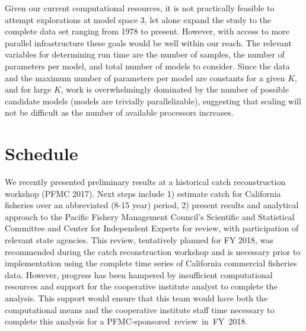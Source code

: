 \documentclass[12pt]{article}
\begin{document}
Given our current computational resources, it is not practically feasible to attempt explorations at model space 3, let alone expand the study to the complete data set ranging from 1978 to present.
However, with access to more parallel infrastructure these goals would be well within our reach. 
The relevant variables for determining run time are the number of samples, the number of parameters per model, and total number of models to consider. 
Since the data and the maximum number of parameters per model are constants for a given $K$, and for large $K$, work is overwhelmingly dominated by the number of possible candidate models (models are trivially parallelizable), suggesting that scaling will not be difficult as the number of available processors increases.

%
\section{Schedule}\label{schedule}
%
We recently presented preliminary results at a historical catch reconstruction workshop (PFMC 2017). 
Next steps include 1) estimate catch for California fisheries over an abbreviated (8-15 year) period, 
2) present results and analytical approach to the Pacific Fishery Management Council’s Scientific 
and Statistical Committee and Center for Independent Experts for review, with participation of 
relevant state agencies. This review, tentatively planned for FY 2018, was recommended during the 
catch reconstruction workshop and is necessary prior to implementation using the complete time 
series of California commercial fisheries data. However, progress has been hampered by insufficient 
computational resources and support for the cooperative institute analyst to complete the analysis. 
This support would ensure that this team would have both the computational means and the cooperative 
institute staff time necessary to complete this analysis for a \mbox{PFMC-sponsored review in FY 2018.}
\end{document}
